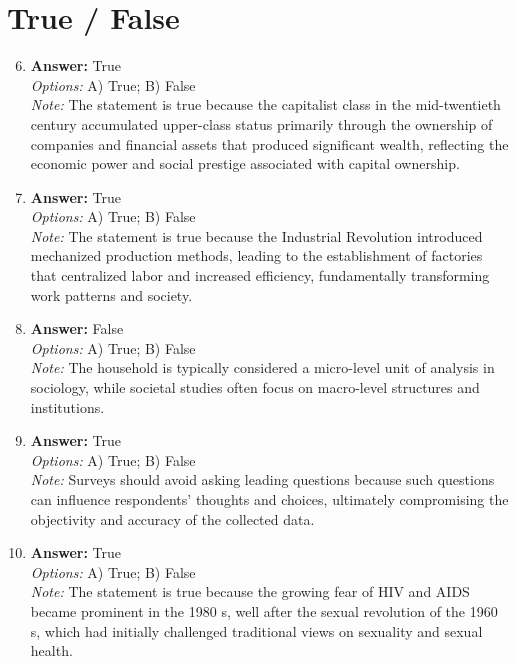 \documentclass[12pt]{article}
\begin{document}
\section*{True / False}
\begin{enumerate}[label=\arabic*.]
\setcounter{enumi}{5}
\item \textbf{Answer:} True
\\ \textit{Options:} A) True; B) False
\\ \textit{Note:} The statement is true because the capitalist class in the mid-twentieth century accumulated upper-class status primarily through the ownership of companies and financial assets that produced significant wealth, reflecting the economic power and social prestige associated with capital ownership.
\item \textbf{Answer:} True
\\ \textit{Options:} A) True; B) False
\\ \textit{Note:} The statement is true because the Industrial Revolution introduced mechanized production methods, leading to the establishment of factories that centralized labor and increased efficiency, fundamentally transforming work patterns and society.
\item \textbf{Answer:} False
\\ \textit{Options:} A) True; B) False
\\ \textit{Note:} The household is typically considered a micro-level unit of analysis in sociology, while societal studies often focus on macro-level structures and institutions.
\item \textbf{Answer:} True
\\ \textit{Options:} A) True; B) False
\\ \textit{Note:} Surveys should avoid asking leading questions because such questions can influence respondents' thoughts and choices, ultimately compromising the objectivity and accuracy of the collected data.
\item \textbf{Answer:} True
\\ \textit{Options:} A) True; B) False
\\ \textit{Note:} The statement is true because the growing fear of HIV and AIDS became prominent in the 1980 s, well after the sexual revolution of the 1960 s, which had initially challenged traditional views on sexuality and sexual health.
\end{enumerate}
\end{document}
